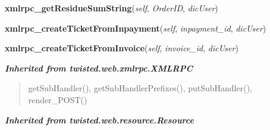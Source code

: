 \hspace{.8\funcindent}\begin{boxedminipage}{\funcwidth}

    \raggedright \textbf{xmlrpc\_getResidueSumString}(\textit{self}, \textit{OrderID}, \textit{dicUser})

\setlength{\parskip}{2ex}
\setlength{\parskip}{1ex}
    \end{boxedminipage}

    \label{cuon:Finances:Finances:xmlrpc_createTicketFromInpayment}

    \vspace{0.5ex}

\hspace{.8\funcindent}\begin{boxedminipage}{\funcwidth}

    \raggedright \textbf{xmlrpc\_createTicketFromInpayment}(\textit{self}, \textit{inpayment\_id}, \textit{dicUser})

\setlength{\parskip}{2ex}
\setlength{\parskip}{1ex}
    \end{boxedminipage}

    \label{cuon:Finances:Finances:xmlrpc_createTicketFromInvoice}

    \vspace{0.5ex}

\hspace{.8\funcindent}\begin{boxedminipage}{\funcwidth}

    \raggedright \textbf{xmlrpc\_createTicketFromInvoice}(\textit{self}, \textit{invoice\_id}, \textit{dicUser})

\setlength{\parskip}{2ex}
\setlength{\parskip}{1ex}
    \end{boxedminipage}


\large{\textbf{\textit{Inherited from twisted.web.xmlrpc.XMLRPC}}}

\begin{quote}
getSubHandler(), getSubHandlerPrefixes(), putSubHandler(), render\_POST()
\end{quote}

\large{\textbf{\textit{Inherited from twisted.web.resource.Resource}}}

